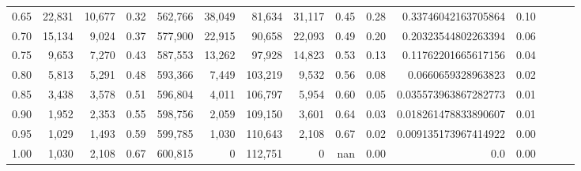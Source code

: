 \begin{tabular}{rrrrrrrrrrrrrrr}
0.65 &  22,831 &  10,677 &  0.32 &  562,766 &   38,049 &   81,634 &   31,117 &  0.45 &  0.28 &   0.33746042163705864 &      0.10 \\
0.70 &  15,134 &   9,024 &  0.37 &  577,900 &   22,915 &   90,658 &   22,093 &  0.49 &  0.20 &   0.20323544802263394 &      0.06 \\
0.75 &   9,653 &   7,270 &  0.43 &  587,553 &   13,262 &   97,928 &   14,823 &  0.53 &  0.13 &   0.11762201665617156 &      0.04 \\
0.80 &   5,813 &   5,291 &  0.48 &  593,366 &    7,449 &  103,219 &    9,532 &  0.56 &  0.08 &    0.0660659328963823 &      0.02 \\
0.85 &   3,438 &   3,578 &  0.51 &  596,804 &    4,011 &  106,797 &    5,954 &  0.60 &  0.05 &  0.035573963867282773 &      0.01 \\
0.90 &   1,952 &   2,353 &  0.55 &  598,756 &    2,059 &  109,150 &    3,601 &  0.64 &  0.03 &  0.018261478833890607 &      0.01 \\
0.95 &   1,029 &   1,493 &  0.59 &  599,785 &    1,030 &  110,643 &    2,108 &  0.67 &  0.02 &  0.009135173967414922 &      0.00 \\
1.00 &   1,030 &   2,108 &  0.67 &  600,815 &        0 &  112,751 &        0 &   nan &  0.00 &                   0.0 &      0.00 \\
\bottomrule
\end{tabular}
